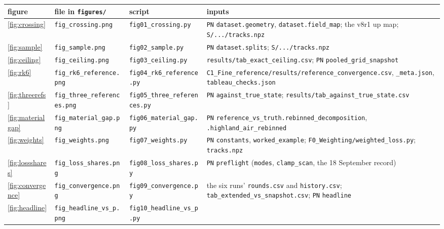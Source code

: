 \documentclass[11pt,a4paper]{article}
\begin{document}
\begin{table}[htbp]
  \centering
  \scriptsize
  \setlength{\tabcolsep}{2pt}
  \begin{tabular}{@{}l l l p{7.0cm}@{}}
    \toprule
    figure & file in \texttt{figures/} & script & inputs \\
    \midrule
    \ref{fig:crossing} & \texttt{fig\_crossing.png} & \texttt{fig01\_crossing.py}
      & \texttt{PN} \texttt{dataset.geometry}, \texttt{dataset.field\_map}; the v8r1 up map; \texttt{S/.../tracks.npz} \\
    \ref{fig:sample} & \texttt{fig\_sample.png} & \texttt{fig02\_sample.py}
      & \texttt{PN} \texttt{dataset.splits}; \texttt{S/.../tracks.npz} \\
    \ref{fig:ceiling} & \texttt{fig\_ceiling.png} & \texttt{fig03\_ceiling.py}
      & \texttt{results/tab\_exact\_ceiling.csv}; \texttt{PN} \texttt{pooled\_grid\_snapshot} \\
    \ref{fig:rk6} & \texttt{fig\_rk6\_reference.png} & \texttt{fig04\_rk6\_reference.py}
      & \texttt{C1\_Fine\_reference/}\newline \texttt{results/reference\_convergence.csv}, \texttt{\_meta.json}, \texttt{tableau\_checks.json} \\
    \ref{fig:threerefs} & \texttt{fig\_three\_references.png} & \texttt{fig05\_three\_references.py}
      & \texttt{PN} \texttt{against\_true\_state}; \texttt{results/tab\_against\_true\_state.csv} \\
    \ref{fig:materialgap} & \texttt{fig\_material\_gap.png} & \texttt{fig06\_material\_gap.py}
      & \texttt{PN} \texttt{reference\_vs\_truth.rebinned\_decomposition}, \texttt{.highland\_air\_rebinned} \\
    \ref{fig:weights} & \texttt{fig\_weights.png} & \texttt{fig07\_weights.py}
      & \texttt{PN} \texttt{constants}, \texttt{worked\_example}; \texttt{F0\_Weighting/weighted\_loss.py}; \texttt{tracks.npz} \\
    \ref{fig:lossshares} & \texttt{fig\_loss\_shares.png} & \texttt{fig08\_loss\_shares.py}
      & \texttt{PN} \texttt{preflight} (\texttt{modes}, \texttt{clamp\_scan}, the 18 September record) \\
    \ref{fig:convergence} & \texttt{fig\_convergence.png} & \texttt{fig09\_convergence.py}
      & the six runs' \texttt{rounds.csv} and \texttt{history.csv}; \texttt{tab\_extended\_vs\_snapshot.csv}; \texttt{PN} \texttt{headline} \\
    \ref{fig:headline} & \texttt{fig\_headline\_vs\_p.png} & \texttt{fig10\_headline\_vs\_p.py}

\end{tabular}
\end{table}
\end{document}
